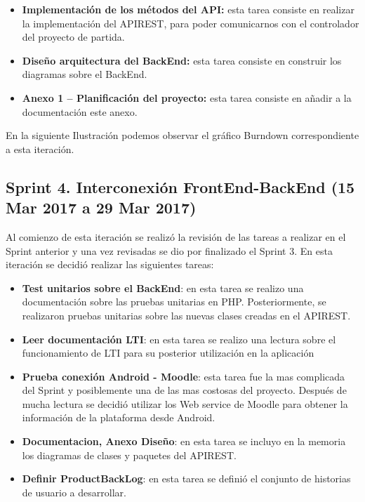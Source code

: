 \begin{itemize}

	\item \textbf{Implementación de los métodos del API:} esta tarea consiste en realizar la implementación del APIREST, para poder comunicarnos con el controlador del proyecto de partida.

	\item \textbf{Diseño arquitectura del BackEnd:} esta tarea consiste en construir los diagramas sobre el BackEnd.

	\item \textbf{Anexo 1 – Planificación del proyecto:} esta tarea consiste en añadir a la documentación este anexo.
\end{itemize}

En la siguiente Ilustración podemos observar el gráfico Burndown correspondiente a esta iteración.


\subsection{Sprint 4. Interconexión FrontEnd-BackEnd (15 Mar 2017 a 29 Mar 2017)}

Al comienzo de esta iteración se realizó la revisión de las tareas a realizar en el Sprint anterior y una vez revisadas se dio por finalizado el Sprint 3. 
En esta iteración se decidió realizar las siguientes tareas:

\begin{itemize}

	\item \textbf{Test unitarios sobre el BackEnd}: en esta tarea se realizo una documentación sobre las pruebas unitarias en PHP. Posteriormente, se realizaron pruebas unitarias sobre las nuevas clases creadas en el APIREST.
	\item \textbf{Leer documentación LTI}: en esta tarea se realizo una lectura sobre el funcionamiento de LTI para su posterior utilización en la aplicación
	\item \textbf{Prueba conexión Android - Moodle}: esta tarea fue la mas complicada del Sprint y posiblemente una de las mas costosas del proyecto. Después de mucha lectura se decidió utilizar los Web service de Moodle para obtener la información de la plataforma desde Android.
	\item \textbf{Documentacion, Anexo Diseño}: en esta tarea se incluyo en la memoria los diagramas de clases y paquetes del APIREST.
	\item \textbf{Definir ProductBackLog}: en esta tarea se definió el conjunto de historias de usuario a desarrollar.

\end{itemize}

